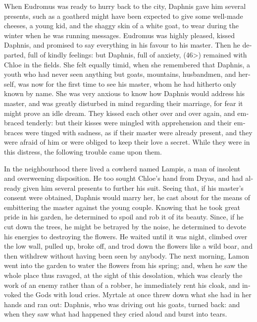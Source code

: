 \documentclass{book}
\begin{document}
\begin{pairs}
\begin{Rightside}
\begin{english}
  When Eudromus was ready to hurry back to the city, Daphnis gave him several presents, such as a goatherd might have been expected to give some well-made cheeses, a young kid, and the shaggy skin of a white goat, to wear during the winter when he was running messages. Eudromus was highly pleased, kissed Daphnis, and promised to say everything in his favour to his master.  Then he departed, full of kindly feelings: but Daphnis, full of anxiety, (46>) remained with Chloe in the fields.  She felt equally timid, when she remembered that Daphnis, a youth who had never seen anything but goats, mountains, husbandmen, and herself, was now for the first time to see his master, whom he had hitherto only known by name.  She was very anxious to know how Daphnis would address his master, and was greatly disturbed in mind regarding their marriage, for fear it might prove an idle dream.  They kissed each other over and over again, and embraced tenderly: but their kisses were mingled with apprehension and their embraces were tinged with sadness, as if their master were already present, and they were afraid of him or were obliged to keep their love a secret.  While they were in this distress, the following trouble came upon them.
\pend


  In the neighbourhood there lived a cowherd named Lampis, a man of insolent and overweening disposition.  He too sought Chloe's hand from Dryas, and had already given him several presents to further his suit.  Seeing that, if his master's consent were obtained, Daphnis would marry her, he cast about for the means of embittering the master against the young couple.  Knowing that he took great pride in his garden, he determined to spoil and rob it of its beauty.  Since, if he cut down the trees, he might be betrayed by the noise, he determined to devote his energies to destroying the flowers.  He waited until it was night, climbed over the low wall, pulled up, broke off, and trod down the flowers like a wild boar, and then withdrew without having been seen by anybody.  The next morning, Lamon went into the garden to water the flowers from his spring; and, when he saw the whole place thus ravaged, at the sight of this desolation, which was clearly the work of an enemy rather than of a robber, he immediately rent his cloak, and invoked the Gods with loud cries.  Myrtale at once threw down what she had in her hands and ran out: Daphnis, who was driving out his goats, turned back: and when they saw what had happened they cried aloud and burst into tears.
\pend



\end{english}
\end{Rightside}
\end{pairs}
\end{document}
